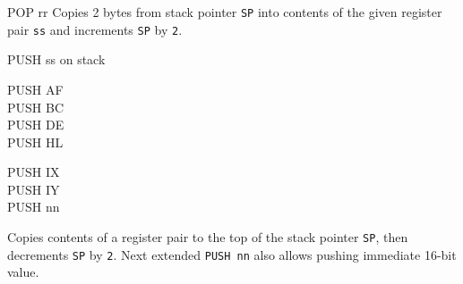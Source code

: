 \begin{basedescript}{
    \desclabelstyle{\multilinelabel}
    \desclabelwidth{3cm}}
\begin{DetailItem}{POP rr}
        Copies 2 bytes from stack pointer {\tt SP} into contents of the given register pair {\tt ss} and increments {\tt SP} by {\tt 2}.

        \begin{DetailEffects}
            \FlagsPOPrr[No effect]
            \FlagsPOPaf[{\tt POP AF}]
        \end{DetailEffects}
				
        \begin{DetailTiming}
        \end{DetailTiming}

    \end{DetailItem}

    \pagebreak
    \begin{DetailItem}{PUSH ss}
        { on stack}
        {}

        \begin{DetailVariants}
            PUSH AF\\
            PUSH BC\\
            PUSH DE\\
            PUSH HL

            \columnbreak
            PUSH IX\\
            PUSH IY\\

            \columnbreak
            PUSH nn\ZXN
        \end{DetailVariants}

        Copies contents of a register pair to the top of the stack pointer {\tt SP}, then decrements {\tt SP} by {\tt 2}. Next extended {\tt PUSH nn} also allows pushing immediate 16-bit value.

        \begin{DetailEffects}
            \FlagsPUSHrr
        \end{DetailEffects}
				
        \begin{DetailTiming}
        \end{DetailTiming}


\end{DetailItem}
\end{basedescript}
